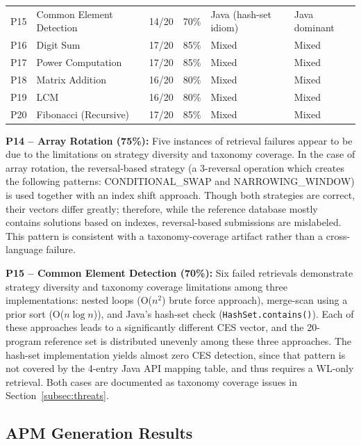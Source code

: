 \begin{table}[!t]
\begin{tabular}{|c|l|c|c|l|l|}
P15 & Common Element Detection    & 14/20 & 70\%  & Java (hash-set idiom)        & Java dominant \\
P16 & Digit Sum                   & 17/20 & 85\%  & Mixed                        & Mixed \\
P17 & Power Computation           & 17/20 & 85\%  & Mixed                        & Mixed \\
P18 & Matrix Addition             & 16/20 & 80\%  & Mixed                        & Mixed \\
P19 & LCM                         & 16/20 & 80\%  & Mixed                        & Mixed \\
P20 & Fibonacci (Recursive)       & 17/20 & 85\%  & Mixed                        & Mixed \\
\hline
\end{tabular}
\end{table}

\textbf{P14 -- Array Rotation (75\%):} Five instances of retrieval failures appear to be due to the limitations on strategy diversity and taxonomy coverage. In the case of array rotation, the reversal-based strategy (a 3-reversal operation which creates the following patterns: CONDITIONAL\_SWAP and NARROWING\_WINDOW) is used together with an index shift approach. Though both strategies are correct, their vectors differ greatly; therefore, while the reference database mostly contains solutions based on indexes, reversal-based submissions are mislabeled. This pattern is consistent with a taxonomy-coverage artifact rather than a cross-language failure.

\textbf{P15 -- Common Element Detection (70\%):} Six failed retrievals demonstrate strategy diversity and taxonomy coverage limitations among three implementations: nested loops (O($n^2$) brute force approach), merge-scan using a prior sort (O($n \log n$)), and Java's hash-set check (\texttt{HashSet.contains()}). Each of these approaches leads to a significantly different CES vector, and the 20-program reference set is distributed unevenly among these three approaches. The hash-set implementation yields almost zero CES detection, since that pattern is not covered by the 4-entry Java API mapping table, and thus requires a WL-only retrieval. Both cases are documented as taxonomy coverage issues in Section~\ref{subsec:threats}.

\subsection{APM Generation Results}
\label{subsec:apm_results}

